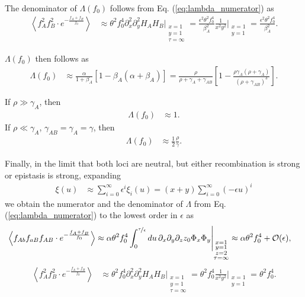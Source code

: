 \documentclass[11pt]{article}
\begin{document}
The denominator of $\Lambda(f_0)$ follows from Eq. (\ref{eq:lambda_numerator}) as 
\begin{align}
    \left\langle f_A^2f_B^2\cdot e^{-\frac{f_{A}+f_{B}}{f_0}}\right\rangle &\approx \theta^2 f_0^4 \partial_x^2 \partial_y^2 H_A H_B \Bigg\vert_{\substack{x=1 \\ y=1 \\ \tau=\infty}} = \frac{\epsilon^2 \theta^2 f_0^4}{\beta_A^2} \frac{1}{x^2y^2}\Bigg\vert_{\substack{x=1 \\ y=1}} = \frac{\epsilon^2 \theta^2 f_0^4}{\beta_A^2}.
\end{align}

$\Lambda(f_0)$ then follows as
\begin{align}\label{eq:lambda_strong_s_neutral}
    \Lambda(f_0) &\approx \frac{\alpha}{1+\beta_A} 
     \left[1 -  \beta_A(\alpha+\beta_A)\right] = \frac{\rho}{\rho + \gamma_A + \gamma_{AB}} \left[1 -\frac{\rho\gamma_A(\rho + \gamma_{A})}{(\rho+\gamma_{AB})^3}\right].
\end{align}

If $\rho \gg \gamma_A$, then 
\begin{align}
    \Lambda(f_0) &\approx 1.
\end{align}
If $\rho \ll \gamma_A$, $\gamma_{AB}=\gamma_A = \gamma$, then
\begin{align}
    \Lambda(f_0) &\approx \frac{1}{2}\frac{\rho}{\gamma}.
\end{align} 

Finally, in the limit that both loci are neutral, but either recombination is strong or epistasis is strong, expanding
\begin{align}
    \xi (u) &\approx \sum_{i=0}^\infty \epsilon^i \xi_i (u) = (x+y) \sum_{i=0}^\infty \left(-\epsilon u\right)^i
    \label{eq:f(u)_series}
\end{align}
we obtain the numerator and the denominator of $\Lambda$ from Eq. (\ref{eq:lambda_numerator}) to the lowest order in $\epsilon$ as 
\begin{align}\label{eq:lambda_num_large_rho}
    \left\langle f_{Ab}f_{aB}f_{AB}\cdot e^{-\frac{f_{A}+f_{B}}{f_0}}\right\rangle
 &\approx \alpha \theta^2 f_0^4 \int_0^{\nicefrac{\tau}{\epsilon}} du\, \partial_x\partial_y\partial_z z_0\Phi_x\Phi_y \Bigg\vert_{\substack{x=1 \\ y=1 \\ z=2 \\ \tau=\infty}} \approx \alpha \theta^2 f_0^4 + \mathcal{O}(\epsilon),
\end{align}
\begin{align}
    \left\langle f_A^2f_B^2\cdot e^{-\frac{f_{A}+f_{B}}{f_0}}\right\rangle &\approx \theta^2 f_0^4 \partial_x^2 \partial_y^2 H_A H_B \Bigg\vert_{\substack{x=1 \\ y=1 \\ \tau=\infty}} = \theta^2 f_0^4 \frac{1}{x^2y^2}\Bigg\vert_{\substack{x=1 \\ y=1}} = \theta^2 f_0^4.
\end{align}
\end{document}
